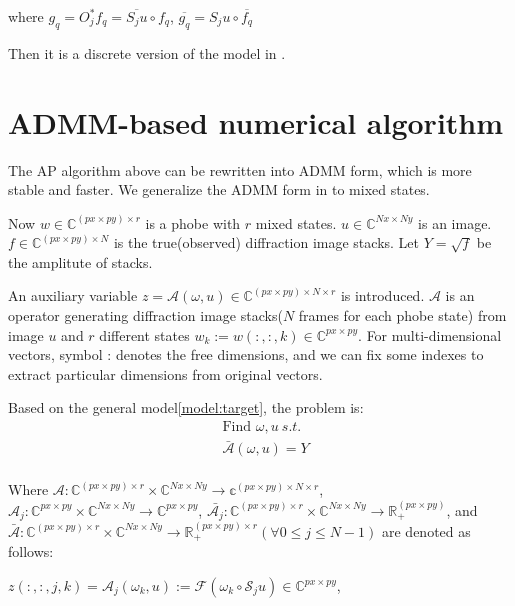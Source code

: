 \documentclass{article}
\numberwithin{equation}{section}
\begin{document}
where $g_q = O_j^*f_q =  \overline{S_ju} \circ f_q$, $\overline{g_q} = S_ju \circ \overline{f_q}$

Then it is a discrete version of the model in \cite{psf}.  

\section{ADMM-based numerical algorithm}

The AP algorithm above can be rewritten into ADMM form, which is more stable and faster. We generalize the ADMM form in \cite{admm} to mixed states.

Now $w \in \mathbb{C}^{(px\times py) \times r}$ is a phobe with $r$ mixed states. $u \in \mathbb{C}^{Nx\times Ny}$ is an image.  $f \in \mathbb{C}^{(px \times py) \times N}$ is the true(observed) diffraction image stacks. Let $Y=\sqrt{f}$ be the amplitute of stacks.

An auxiliary variable $z=\mathcal{A}(\omega, u) \in \mathbb{C}^{(px \times py) \times N \times r}$ is introduced. $\mathcal{A}$ is an operator generating diffraction image stacks($N$ frames for each phobe state) from image $u$ and $r$ different states $w_k:=w(:,:,k) \in \mathbb{C}^{px \times py}$. For multi-dimensional vectors, symbol : denotes the free dimensions, and we can fix some indexes to extract particular dimensions from original vectors.  

Based on the general model\ref{model:target}, the problem is:
$$
\begin{aligned}
&\mbox{Find } \omega,u \ s.t.\\
& \bar{\mathcal{A}}(\omega, u)=Y\\
\end{aligned}
$$


Where $\mathcal{A}: \mathbb{C}^{(px\times py)\times r} \times \mathbb{C}^{Nx \times Ny} \rightarrow \mathbb{c}^{(px \times py) \times N \times r}$,$\mathcal{A}_{j}: \mathbb{C}^{px\times py} \times \mathbb{C}^{Nx \times Ny} \rightarrow \mathbb{C}^{px\times py} $,
$\bar{\mathcal{A}_j}:\mathbb{C}^{(px\times py)\times r} \times \mathbb{C}^{Nx \times Ny} \rightarrow \mathbb{R}_+^{(px \times py)}$, and $\bar{\mathcal{A}}:\mathbb{C}^{(px\times py)\times r} \times \mathbb{C}^{Nx \times Ny} \rightarrow \mathbb{R}_+^{(px \times py) \times r} (\forall 0 \leq j \leq N-1)$ are
denoted as follows:

$z(:,:,j,k) = \mathcal{A}_{j}(\omega_k, u):=\mathcal{F}\left(\omega_k \circ \mathcal{S}_{j} u\right) \in \mathbb{C}^{px\times py}$,
\end{document}
